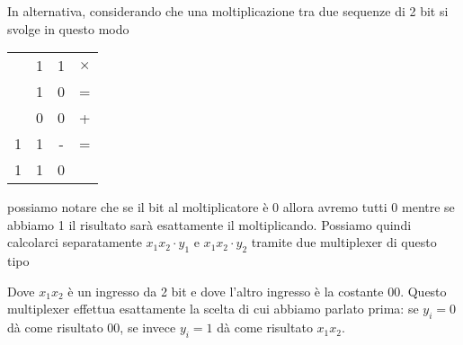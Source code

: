 \begin{figure}[!ht]\centering
{}
\end{figure}

In alternativa, considerando che una moltiplicazione tra due sequenze di 2 bit si svolge in questo
modo
\begin{center}
	\begin{tabular}{c c c c}
		  & 1 & 1 & $\times$ \\
		  & 1 & 0 & =        \\ \hline
		  & 0 & 0 & +        \\
		1 & 1 & - & =        \\ \hline
		1 & 1 & 0
	\end{tabular}
\end{center}
possiamo notare che se il bit al moltiplicatore è 0 allora avremo tutti 0 mentre se abbiamo 1 il
risultato sarà esattamente il moltiplicando. Possiamo quindi calcolarci separatamente
$x_1 x_2 \cdot y_1$ e $x_1 x_2 \cdot y_2$ tramite due multiplexer di questo tipo
\begin{center}
\end{center}
Dove $x_1 x_2$ è un ingresso da 2 bit e dove l'altro ingresso è la costante 00. Questo multiplexer
effettua esattamente la scelta di cui abbiamo parlato prima: se $y_i = 0$ dà come risultato 00, se
invece $y_i = 1$ dà come risultato $x_1 x_2$.

